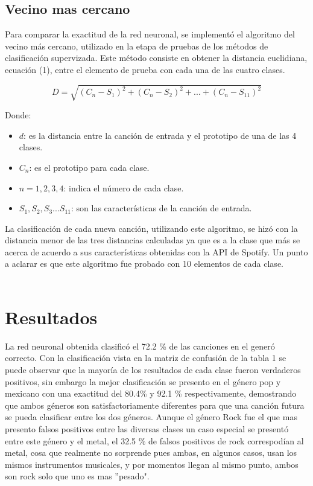 \documentclass[conference]{IEEEtran}
\begin{document}
\subsection{Vecino mas cercano}
Para comparar la exactitud de la red neuronal, se implementó el algoritmo del vecino m\'as cercano, utilizado en la etapa de pruebas de los métodos de clasificación supervizada. Este m\'etodo consiste en obtener la distancia euclidiana, ecuaci\'on (1), entre el elemento de prueba con cada una de las cuatro clases.

\begin{equation}
	D = \sqrt{ (C_n - S_{1} )^2 + (C_n - S_{2} )^2 + ... + (C_n - S_{11} )^2 }
\end{equation}

Donde:\\
\begin{itemize}
	\item $d$: es la distancia entre la canción de entrada y el prototipo de una de las 4 clases.
	\item $C_n$: es el prototipo para cada clase.
	\item $n = 1, 2, 3, 4$: indica el número de cada clase.
	\item $S_{1}, S_{2}, S_{3} ... S_{11}$: son las características de la canción de entrada. \\
\end{itemize}

La clasificación de cada nueva canción, utilizando este algoritmo, se hizó con la distancia menor de las tres distancias calculadas ya que es a la clase que más se acerca de acuerdo a sus características obtenidas con la API de Spotify.
Un punto a aclarar es que este algoritmo fue probado con 10 elementos de cada clase.\\\\

\section{Resultados}

La red neuronal obtenida clasificó el 72.2 \% de las canciones en el generó correcto. Con la clasificación vista en la matriz de confusión de la tabla 1 se puede observar que la mayoría de los resultados de cada clase fueron verdaderos positivos, sin embargo la mejor clasificación se presento en el género pop y mexicano con una exactitud del 80.4\% y 92.1 \% respectivamente, demostrando que  ambos géneros son satisfactoriamente diferentes para que una canción futura se pueda clasificar entre los dos géneros. Aunque el género Rock fue el que mas presento falsos positivos entre las diversas clases un caso especial se presentó entre este género y el metal, el 32.5 \% de falsos positivos de rock correspodían al metal, cosa que realmente no sorprende pues ambas, en algunos casos, usan los mismos instrumentos musicales, y por momentos llegan al mismo punto, ambos son rock solo que uno es mas ''pesado". 
 
\end{document}
